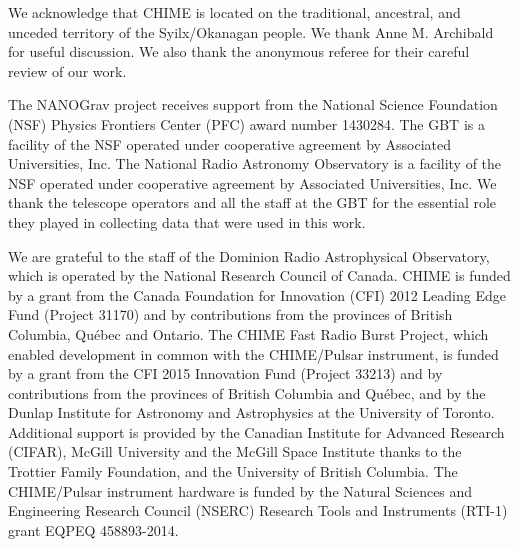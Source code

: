 \documentclass[twocolumn]{aastex63}
\begin{document}
\begin{acknowledgments}    
We acknowledge that CHIME is located on the traditional, ancestral, and unceded territory of the Syilx/Okanagan people. We thank Anne M. Archibald for useful discussion. We also thank the anonymous referee for their careful review of our work.

The NANOGrav project receives support from the National Science Foundation (NSF) Physics Frontiers Center (PFC) award number 1430284. The GBT is a facility of the NSF operated under cooperative agreement by Associated Universities, Inc. The National Radio Astronomy Observatory is a facility of the NSF operated under cooperative agreement by Associated Universities, Inc. We thank the telescope operators and all the staff at the GBT for the essential role they played in collecting data that were used in this work. 

We are grateful to the staff of the Dominion Radio Astrophysical Observatory, which is operated by the National Research Council of Canada.  CHIME is funded by a grant from the Canada Foundation for Innovation (CFI) 2012 Leading Edge Fund (Project 31170) and by contributions from the provinces of British Columbia, Qu\'ebec and Ontario. The CHIME Fast Radio Burst Project, which enabled development in common with the CHIME/Pulsar instrument, is funded by a grant from the CFI 2015 Innovation Fund (Project 33213) and by contributions from the provinces of British Columbia and Qu\'ebec, and by the Dunlap Institute for Astronomy and Astrophysics at the University of Toronto. Additional support is provided by the Canadian Institute for Advanced Research (CIFAR), McGill University and the McGill Space Institute thanks to the Trottier Family Foundation, and the University of British Columbia. The CHIME/Pulsar instrument hardware is funded by the Natural Sciences and Engineering Research Council (NSERC) Research Tools and Instruments (RTI-1) grant EQPEQ 458893-2014.


\end{acknowledgments}
\end{document}

